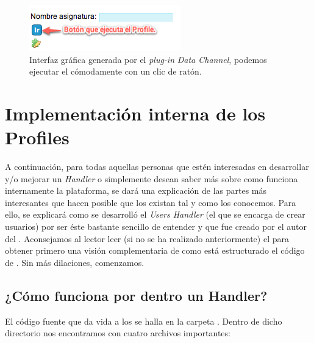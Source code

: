 \begin{figure}
\centering
\includegraphics{../graphics/fig_interfaz_plugin_data_channel.png}
\caption{Interfaz gráfica generada por el \textit{plug-in} \textit{Data Channel}, podemos ejecutar el \profile{} cómodamente con un clic de ratón.}\label{fig:interfaz_plugin_data_channel}
\end{figure}

\section{Implementación interna de los Profiles}

A continuación, para todas aquellas personas que estén interesadas en desarrollar y/o mejorar un \textit{Handler} o simplemente desean saber más sobre como funciona internamente la plataforma, se dará una explicación de las partes más interesantes que hacen posible que los \profiles{} existan tal y como los conocemos. Para ello, se explicará como se desarrolló el \textit{Users Handler} (el que se encarga de crear usuarios) por ser éste bastante sencillo de entender y que fue creado por el autor del \pfc{}. Aconsejamos al lector leer (si no se ha realizado anteriormente) el  para obtener primero una visión complementaria de como está estructurado el código de \tiki{}. Sin más dilaciones, comenzamos.

\subsection{¿Cómo funciona por dentro un Handler?}

El código fuente que da vida a los \profiles{} se halla en la carpeta . Dentro de dicho directorio nos encontramos con cuatro archivos importantes:

